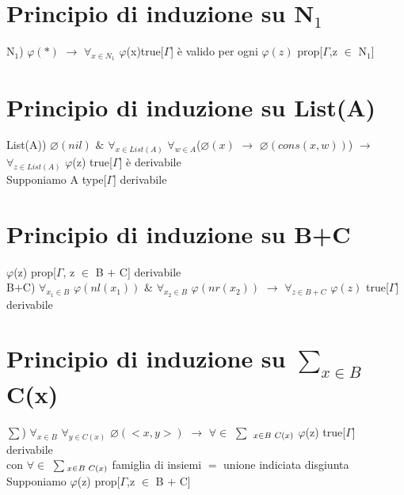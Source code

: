 \section{Principio di induzione su N$_1$}
\label{sec:principio-di-induzione-N1}
N$_1$) $\varphi(\ast)$ $\rightarrow$ $\forall_{x \in N_1}$ $\varphi$(x)true[$\Gamma$] \`e valido per ogni $\varphi(z)$ prop[$\Gamma$,z $\in$ N$_1$]

\section{Principio di induzione su List(A)}
\label{sec:principio-di-induzione-List(A)}
List(A)) $\varnothing(nil)$ $\&$ $\forall_{x \in List(A)}$ $\forall_{w \in A}$($\varnothing(x)$ $\rightarrow$ $\varnothing(cons(x,w))$) $\rightarrow$ $\forall_{z \in List(A)}$ $\varphi$(z) true[$\Gamma$] \`e derivabile\\
Supponiamo A type[$\Gamma$] derivabile 
\section{Principio di induzione su B+C}
\label{sec:principio-di-induzione-B+C}
$\varphi$(z) prop[$\Gamma$, z $\in$ B $+$ C] derivabile\\
B$+$C) $\forall_{x_1 \in B}$  $\varphi(nl(x_1))$ $\&$ $\forall_{x_2 \in B}$  $\varphi(nr(x_2))$ $\rightarrow$ $\forall_{z\in B+C}$  $\varphi(z)$ true[$\Gamma$] derivabile
\section{Principio di induzione su $\sum\limits_{x \in B}$ C(x)}
\label{sec:principio-di-induzione-sum}
{\scriptsize $\sum$}) $\forall_{x \in B}$ $\forall_{y \in C(x)}$ $\varnothing(<x,y>)$ $\rightarrow$ $\forall \in$ {\scriptsize$\sum$} $_{x \in B \hspace{0.1cm}C(x)}$ $\varphi$(z) true[$\Gamma$] derivabile\\
con $\forall \in$ {\scriptsize$\sum$}$_{x \in B \hspace{0.1cm}C(x)}$ famiglia di insiemi $=$ unione indiciata disgiunta\\
Supponiamo $\varphi$(z) prop[$\Gamma$,z $\in$ B $+$ C]

